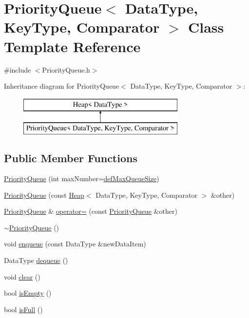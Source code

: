 \hypertarget{class_priority_queue}{\section{Priority\-Queue$<$ Data\-Type, Key\-Type, Comparator $>$ Class Template Reference}
\label{class_priority_queue}
}


{\ttfamily \#include $<$Priority\-Queue.\-h$>$}

Inheritance diagram for Priority\-Queue$<$ Data\-Type, Key\-Type, Comparator $>$\-:\begin{figure}[H]
\begin{center}
\leavevmode
\includegraphics[height=2.000000cm]{class_priority_queue}
\end{center}
\end{figure}
\subsection*{Public Member Functions}
\begin{DoxyCompactItemize}
\item 
\hyperlink{class_priority_queue_a47de2a46cff1d6a6ed30a99c94dc1b14}{Priority\-Queue} (int max\-Number=\hyperlink{_priority_queue_8h_a88703212007be018800be64f2f5fde2f}{def\-Max\-Queue\-Size})
\item 
\hyperlink{class_priority_queue_ab3b8c46007394fe44868b316ec157b92}{Priority\-Queue} (const \hyperlink{class_heap}{Heap}$<$ Data\-Type, Key\-Type, Comparator $>$ \&other)
\item 
\hyperlink{class_priority_queue}{Priority\-Queue} \& \hyperlink{class_priority_queue_ad4a011c82e41027ff8c2b55fe1923b33}{operator=} (const \hyperlink{class_priority_queue}{Priority\-Queue} \&other)
\item 
\hyperlink{class_priority_queue_a7d959dc823b18c647aa0ee4a80f27881}{$\sim$\-Priority\-Queue} ()
\item 
void \hyperlink{class_priority_queue_a61f3339cf0e87c67ed004f8eff0a1bfa}{enqueue} (const Data\-Type \&new\-Data\-Item)
\item 
Data\-Type \hyperlink{class_priority_queue_a5bc758e313d6244e672ea6e81d695a46}{dequeue} ()
\item 
void \hyperlink{class_priority_queue_a8386c8ea2b5806646cc7de9dd1b8df4b}{clear} ()
\item 
bool \hyperlink{class_priority_queue_a8cc481ad399a3117de6b1779a9d3edfe}{is\-Empty} ()
\item 
bool \hyperlink{class_priority_queue_a959aa69891bcbf024674ceaf527eeeec}{is\-Full} ()
\end{DoxyCompactItemize}
